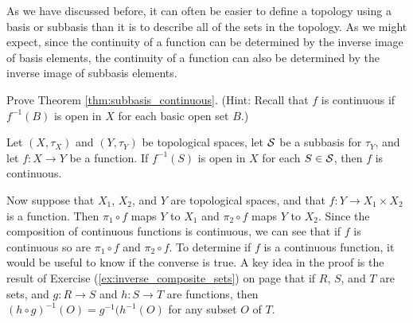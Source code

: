 As we have discussed before, it can often be easier to define a topology using a basis or subbasis than it is to describe all of the sets in the topology. As we might expect, since the continuity of a function can be determined by the inverse image of basis elements, the continuity of a function can also be determined by the inverse image of subbasis elements.

\begin{activity} Prove Theorem \ref{thm:subbasis_continuous}. (Hint: Recall that $f$ is continuous if $f^{-1}(B)$ is open in $X$ for each basic open set $B$.)

\begin{theorem} \label{thm:subbasis_continuous} Let $(X, \tau_X)$ and $(Y, \tau_Y)$ be topological spaces, let $\mathcal{S}$ be a subbasis for $\tau_Y$, and let $f: X \to Y$ be a function. If $f^{-1}(S)$ is open in $X$ for each $S \in \mathcal{S}$, then $f$ is continuous.
\end{theorem}

 \end{activity}

\begin{comment}

\ActivitySolution Recall that $f$ is continuous if $f^{-1}(B)$ is open in $X$ for each basic open set $B$. Let $B$ be a basic open set. Since $\CS$ is a subbasis for $\tau_Y$, there are finitely many elements $S_1$, $S_2$, $\ldots$, $S_n$ in $\CS$ such that $B = \bigcap_{i=1}^n S_i$. Then
\[f^{-1}(B) = f^{-1}\left( \bigcap_{i=1}^n S_i \right) = \bigcap_{i=1}^n f^{-1}(S_i).\]
Because $f^{-1}(S_i)$ is open in $X$ for each $i$, and any finite intersection of open sets is open, we conclude that $f^{-1}(B)$ is open in $X$ and that $f$ is continuous.

\end{comment}

Now suppose that $X_1$, $X_2$, and $Y$ are topological spaces, and that $f: Y \to X_1 \times X_2$ is a function. Then $\pi_1 \circ f$ maps $Y$ to $X_1$ and $\pi_2 \circ f$ maps $Y$ to $X_2$. Since the composition of continuous functions is continuous, we can see that if $f$ is continuous so are $\pi_1\circ f$ and $\pi_2 \circ f$. To determine if $f$ is a continuous function, it would be useful to know if the converse is true. A key idea in the proof is the result of Exercise (\ref{ex:inverse_composite_sets}) on page \pageref{ex:inverse_composite_sets} that if $R$, $S$, and $T$ are sets, and $g: R \to S$ and $h : S \to T$ are functions, then $(h \circ g)^{-1}(O) = g^{-1}(h^{-1}(O)$ for any subset $O$ of $T$.  


